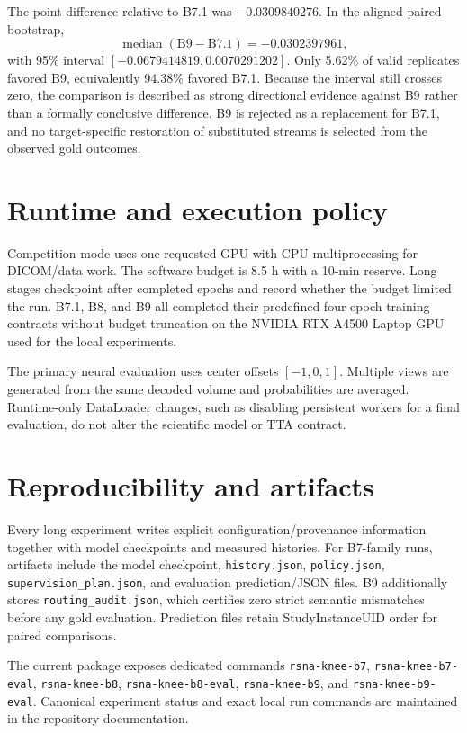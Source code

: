 \documentclass[preprint,12pt]{elsarticle}
\newcommand{\code}[1]{\texttt{#1}}
\begin{document}
The point difference relative to B7.1 was $-0.0309840276$. In the aligned paired bootstrap,
\begin{equation}
\operatorname{median}(\mathrm{B9}-\mathrm{B7.1})=-0.0302397961,
\end{equation}
with 95\% interval $[-0.0679414819,0.0070291202]$. Only 5.62\% of valid replicates favored B9, equivalently 94.38\% favored B7.1. Because the interval still crosses zero, the comparison is described as strong directional evidence against B9 rather than a formally conclusive difference. B9 is rejected as a replacement for B7.1, and no target-specific restoration of substituted streams is selected from the observed gold outcomes.

\section{Runtime and execution policy}
\label{sec:runtime}

Competition mode uses one requested GPU with CPU multiprocessing for DICOM/data work. The software budget is 8.5 h with a 10-min reserve. Long stages checkpoint after completed epochs and record whether the budget limited the run. B7.1, B8, and B9 all completed their predefined four-epoch training contracts without budget truncation on the NVIDIA RTX A4500 Laptop GPU used for the local experiments.

The primary neural evaluation uses center offsets $[-1,0,1]$. Multiple views are generated from the same decoded volume and probabilities are averaged. Runtime-only DataLoader changes, such as disabling persistent workers for a final evaluation, do not alter the scientific model or TTA contract.

\section{Reproducibility and artifacts}
\label{sec:reproducibility}

Every long experiment writes explicit configuration/provenance information together with model checkpoints and measured histories. For B7-family runs, artifacts include the model checkpoint, \code{history.json}, \code{policy.json}, \code{supervision\_plan.json}, and evaluation prediction/JSON files. B9 additionally stores \code{routing\_audit.json}, which certifies zero strict semantic mismatches before any gold evaluation. Prediction files retain StudyInstanceUID order for paired comparisons.

The current package exposes dedicated commands \code{rsna-knee-b7}, \code{rsna-knee-b7-eval}, \code{rsna-knee-b8}, \code{rsna-knee-b8-eval}, \code{rsna-knee-b9}, and \code{rsna-knee-b9-eval}. Canonical experiment status and exact local run commands are maintained in the repository documentation.
\end{document}
